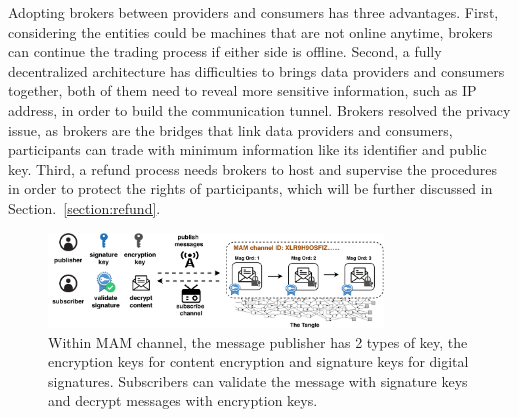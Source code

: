 \documentclass[conference]{IEEEtran}
\begin{document}
Adopting brokers between providers and consumers has three advantages. First, considering the entities could be machines that are not online anytime, brokers can continue the trading process if either side is offline. Second, a fully decentralized architecture has difficulties to brings data providers and consumers together, both of them need to reveal more sensitive information, such as IP address, in order to build the communication tunnel. Brokers resolved the privacy issue, as brokers are the bridges that link data providers and consumers, participants can trade with minimum information like its identifier and public key. Third, a refund process needs brokers to host and supervise the procedures in order to protect the rights of participants, which will be further discussed in Section.~\ref{section:refund}.

\begin{figure}[h]
    \centering
    \includegraphics[width=3.5in]{channel_and_key_fold}
    \caption{Within MAM channel, the message publisher has 2 types of key, the encryption keys for content encryption and signature keys for digital signatures. Subscribers can validate the message with signature keys and decrypt messages with encryption keys.}
    \label{fig:channel_and_key}
\end{figure}
\end{document}
